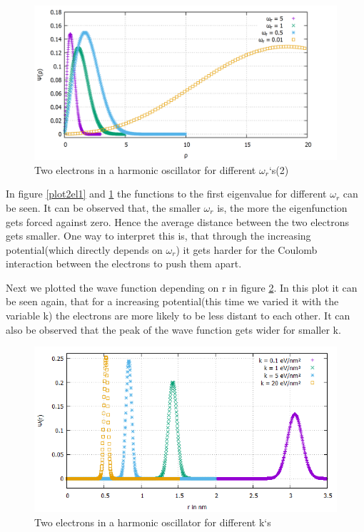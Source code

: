 \documentclass[10pt,a4paper]{article}
\begin{document}
\begin{figure}[h]
	\includegraphics[scale = 0.25]{2Electrons_comparison2_thick.png}
	\centering
	\caption{Two electrons in a harmonic oscillator for different $\omega_{r}$`s(2) }
	\label{plot2el2}
\end{figure}


In figure \ref{plot2el1} and \ref{plot2el2} the functions to the first eigenvalue for different $\omega_{r}$ can be seen. It can be observed that, the smaller $\omega_{r}$ is, the more the eigenfunction gets forced against zero. Hence the average distance between the two electrons gets smaller. One way to interpret this is, that through the increasing potential(which directly depends on $\omega_{r}$) it gets harder for the Coulomb interaction between the electrons to push them apart.

Next we plotted the wave function depending on r in figure \ref{plot2elr}. In this plot it can be seen again, that for a increasing potential(this time we varied it with the variable k) the electrons are more likely to be less distant to each other. It can also be observed that the peak of the wave function gets wider for smaller k.

\begin{figure}[h]
	\includegraphics[scale = 0.65]{comparison_different_k_thick.png}
	\centering
	\caption{Two electrons in a harmonic oscillator for different k`s}
	\label{plot2elr}
\end{figure}
\end{document}
